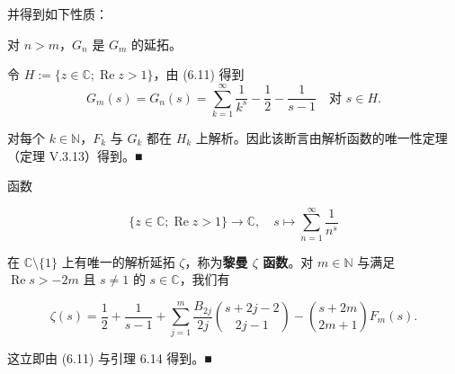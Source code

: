 并得到如下性质：

\begin{lemma}

对 $ n > m $，$ G_n $ 是 $ G_m $ 的延拓。

\proofhead
令 $ H := \{ z \in \mathbb{C} ; \operatorname{Re} z > 1 \} $，由 (6.11) 得到
\[
G_m(s) = G_n(s) = \sum_{k=1}^{\infty}\frac{1}{k^s} - \frac{1}{2} - \frac{1}{s-1} \quad \text{对 } s \in H .
\]

对每个 $ k \in \mathbb{N} $，$ F_k $ 与 $ G_k $ 都在 $ H_k $ 上解析。因此该断言由解析函数的唯一性定理（定理 V.3.13）得到。\nobreak\hspace{0.35em}■

\end{lemma}

\begin{theorem}

函数

\[
\{ z \in \mathbb{C} ; \operatorname{Re} z > 1 \} \to \mathbb{C} , \quad s \mapsto \sum_{n=1}^{\infty}\frac{1}{n^s}
\]

在 $ \mathbb{C} \setminus \{1\} $ 上有唯一的解析延拓 $ \zeta $，称为\textbf{黎曼 $ \zeta $ 函数}。对 $ m \in \mathbb{N} $ 与满足 $ \operatorname{Re} s > -2m $ 且 $ s \ne 1 $ 的 $ s \in \mathbb{C} $，我们有

\[
\zeta(s) = \frac{1}{2} + \frac{1}{s-1} + \sum_{j=1}^{m}\frac{B_{2j}}{2j}\binom{s+2j-2}{2j-1} - \binom{s+2m}{2m+1}F_m(s) .
\]

\proofhead
这立即由 (6.11) 与引理 6.14 得到。\nobreak\hspace{0.35em}■
\end{theorem}

